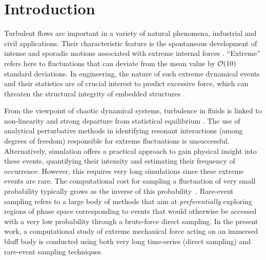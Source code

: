 \section{Introduction}

%
Turbulent flows are important in a variety of natural phenomena, industrial and civil applications.
Their characteristic feature is the spontaneous development of intense and sporadic motions associated with extreme internal forces \citep{lesieur_book,donzis_sreenivasan_2010,Yeung}.
``Extreme'' refers here to fluctuations that can deviate from the mean value by ${\cal{O}}(10)$ standard deviations.
In engineering, the nature of such extreme dynamical events and their statistics are of crucial interest to predict excessive force, which can threaten the structural integrity of embedded structures \citep{kanev2010}.
%

From the viewpoint of chaotic dynamical systems, turbulence in fluids is linked to non-linearity and strong departure from statistical equilibrium \citep{KRAICHNAN}.
The use of analytical perturbative methods in identifying resonant interactions (among degrees of freedom) responsible for extreme fluctuations is unsuccessful.
Alternatively, simulation offers a practical approach to gain physical insight into these events, quantifying their intensity and estimating their frequency of occurrence.
However, this requires very long simulations since these extreme events are rare. The computational cost for sampling a fluctuation of very small probability typically grows as the inverse of this probability~\citep{wouters2016rare}.
%
%
{Rare-event sampling refers to a large body of methods that aim at \emph{preferentially} exploring  regions of phase space corresponding to  events that would otherwise be accessed with a very low probability through a brute-force direct sampling.}
%
%	
%
In the present work, a computational study of extreme mechanical force acting on an immersed bluff body is conducted using both very long time-series (direct sampling) and rare-event sampling techniques.


